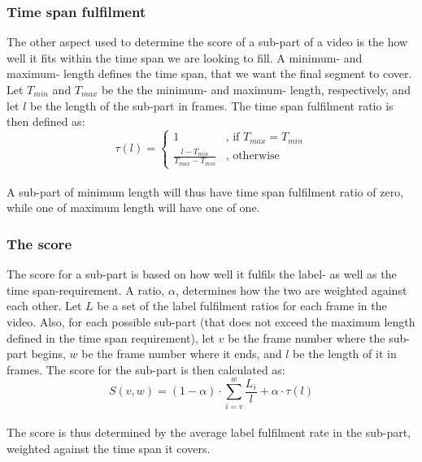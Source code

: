 \subsubsection{Time span fulfilment}
%
The other aspect used to determine the score of a sub-part of a video is the how well it fits within the time span we are looking to fill. A minimum- and maximum- length defines the time span, that we want the final segment to cover. Let $T_{min}$ and $T_{max}$ be the the minimum- and maximum- length, respectively, and let $l$ be the length of the sub-part in frames. The time span fulfilment ratio is then defined as:\\
%
\begin{equation}
\tau(l) =
\begin{cases}
1 & \text{, if } T_{max} = T_{min}\\
\frac{l-T_{min}}{T_{max}-T_{min}} &  \text{, otherwise}
\end{cases}
\end{equation} 
%
\\
%
A sub-part of minimum length will thus have time span fulfilment ratio of zero, while one of maximum length will have one of one. 
%
\subsubsection{The score}
%
The score for a sub-part is based on how well it fulfils the label- as well as the time span-requirement. A ratio, $\alpha$, determines how the two are weighted against each other. Let $L$ be a set of the label fulfilment ratios for each frame in the video. Also, for each possible sub-part (that does not exceed the maximum length defined in the time span requirement), let $v$ be the frame number where the sub-part begins, $w$ be the frame number where it ends, and $l$ be the length of it in frames. The score for the sub-part is then calculated as:\\
%
\begin{equation}
S(v,w) =(1-\alpha) \cdot \sum_{i=v}^{w} \frac{L_{i}}{l} + \alpha \cdot \tau(l)
\end{equation}
%
\\
%
The score is thus determined by the average label fulfilment rate in the sub-part, weighted against the time span it covers.
%
